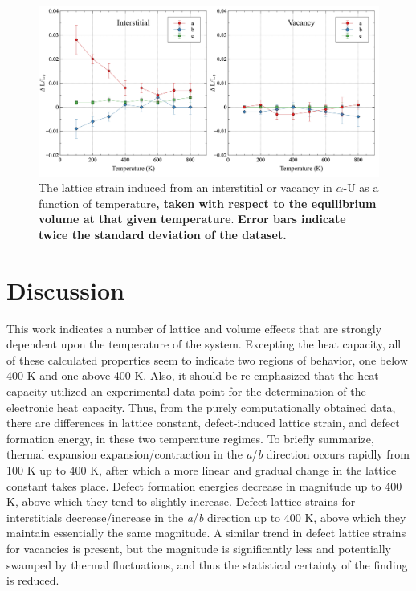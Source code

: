 \documentclass[utf8]{frontiersSCNS} %
\providecommand{\DIFaddtex}[1]{{\bf #1}} %
\providecommand{\DIFaddFL}[1]{\DIFadd{#1}} %
\providecommand{\DIFaddbeginFL}{} %
\providecommand{\DIFaddendFL}{} %
\providecommand{\DIFdelbeginFL}{} %
\providecommand{\DIFdelendFL}{} %
\providecommand{\DIFadd}[1]{\texorpdfstring{\DIFaddtex{#1}}{#1}} %
\begin{document}
 \begin{figure}[hbt]
	\centering
	\DIFdelbeginFL %
\DIFdelendFL \DIFaddbeginFL \includegraphics[width=1.0\textwidth]{defect_strain.jpg}
    \DIFaddendFL \caption{The lattice strain induced from an interstitial or vacancy in $\alpha$-U as a function of temperature\DIFaddbeginFL \DIFaddFL{, taken with respect to the equilibrium volume at that given temperature}\DIFaddendFL . \DIFaddbeginFL \DIFaddFL{Error bars indicate twice the standard deviation of the dataset.}\DIFaddendFL }\label{fig:strain}
\end{figure}

\FloatBarrier

\section{Discussion}

This work indicates a number of lattice and volume effects that are strongly dependent upon the temperature of the system. Excepting the heat capacity, all of these calculated properties seem to indicate two regions of behavior, one below 400 K and one above 400 K. Also, it should be re-emphasized that the heat capacity utilized an experimental data point for the determination of the electronic heat capacity. Thus, from the purely computationally obtained data, there are differences in lattice constant, defect-induced lattice strain, and defect formation energy, in these two temperature regimes. To briefly summarize, thermal expansion expansion/contraction in the \textit{a}/\textit{b} direction occurs rapidly from 100 K up to 400 K, after which a more linear and gradual change in the lattice constant takes place. Defect formation energies decrease in magnitude up to 400 K, above which they tend to slightly increase. Defect lattice strains for interstitials decrease/increase in the \textit{a}/\textit{b} direction up to 400 K, above which they maintain essentially the same magnitude. A similar trend in defect lattice strains for vacancies is present, but the magnitude is significantly less and potentially swamped by thermal fluctuations, and thus the statistical certainty of the finding is reduced. 
\end{document}

